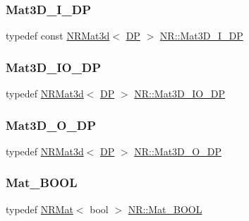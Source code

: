 \subsubsection{\texorpdfstring{Mat3D\_I\_DP}{Mat3D\_I\_DP}}
{\footnotesize\ttfamily typedef const \mbox{\hyperlink{classNR_1_1NRMat3d}{N\+R\+Mat3d}}$<$ \mbox{\hyperlink{namespaceNR_af6ff762dd605ff477b8e52387253a02a}{DP}} $>$ \mbox{\hyperlink{namespaceNR_a3cb7a4c8eb0a2a98a239a9a8200ec5d8}{N\+R\+::\+Mat3\+D\+\_\+\+I\+\_\+\+DP}}}

\mbox{\label{namespaceNR_ae2c061d1bcce9ea856c905d761956d76}} 
\subsubsection{\texorpdfstring{Mat3D\_IO\_DP}{Mat3D\_IO\_DP}}
{\footnotesize\ttfamily typedef \mbox{\hyperlink{classNR_1_1NRMat3d}{N\+R\+Mat3d}}$<$ \mbox{\hyperlink{namespaceNR_af6ff762dd605ff477b8e52387253a02a}{DP}} $>$ \mbox{\hyperlink{namespaceNR_ae2c061d1bcce9ea856c905d761956d76}{N\+R\+::\+Mat3\+D\+\_\+\+I\+O\+\_\+\+DP}}}

\mbox{\label{namespaceNR_a74d09ea99e0452b529d2eb055cb09108}} 
\subsubsection{\texorpdfstring{Mat3D\_O\_DP}{Mat3D\_O\_DP}}
{\footnotesize\ttfamily typedef \mbox{\hyperlink{classNR_1_1NRMat3d}{N\+R\+Mat3d}}$<$ \mbox{\hyperlink{namespaceNR_af6ff762dd605ff477b8e52387253a02a}{DP}} $>$ \mbox{\hyperlink{namespaceNR_a74d09ea99e0452b529d2eb055cb09108}{N\+R\+::\+Mat3\+D\+\_\+\+O\+\_\+\+DP}}}

\mbox{\label{namespaceNR_a59411c0161320f28563d72f97b88ad69}} 
\subsubsection{\texorpdfstring{Mat\_BOOL}{Mat\_BOOL}}
{\footnotesize\ttfamily typedef \mbox{\hyperlink{classNR_1_1NRMat}{N\+R\+Mat}}$<$ bool $>$ \mbox{\hyperlink{namespaceNR_a59411c0161320f28563d72f97b88ad69}{N\+R\+::\+Mat\+\_\+\+B\+O\+OL}}}

